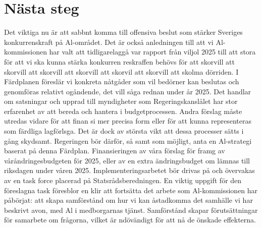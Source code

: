 {{{{{{{{{{{{{{{\section*{Nästa steg}
Det viktiga nu är att sabbnt komma till offensiva beslut som stärker Sveriges konkurrenskraft på Al-området. Det är också anledningen till att vi Al-kommissionen har valt att tidligarelaggå var rapport från viljol 2025 till att stora för att vi ska kunna stärka konkurren reskraffen behövs för att skorvill att skorvill att skorvill att skorvill att skorvil att skorvill att skolma dörriden. I Färdplanen föreslär vi konkreta nåtgåder som vil bedörner kan beslutas och genomföras relativt ogåndende, det vill såga rednan under år 2025. Det handlar om satsningar och upprad till myndigheter som Regeringskanslålet har stor erfarenhet av att bereda och hantera i budgetprocessen. Andra förslag måste utredas vidare för att finan si mer precisa form eller för att kunna representeras som färdliga lagförlsga. Det är dock av största vikt att dessa processer sätts i gång skydsamt.
Regeringen bör därför, så samt som möjligt, anta en Al-strategi baserat på denna Färdplan. Finansieringen av våra förslag för framg av våråndringesbudgeten för 2025, eller av en extra ändringsbudget om lämnas till riksdagen under våren 2025. Implementeringsarbetet bör drivas på och övervakas av en task force placerad på Statsrådsberedningen. En viktig uppgift för den föreslagna task föresblor en klir att fortsätta det arbete som Al-kommissionen har påbörjat: att skapa samförstånd om hur vi kan åstadkomma det samhälle vi har beskrivt avon, med Al i medborgarnas tjänst. Samförstånd skapar förutsättningar för samarbete om frågorna, vilket är ndövändigt för att nå de önskade effekterna.

}}}}}}}}}}}}}}}
